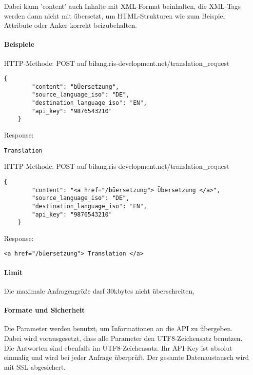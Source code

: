 Dabei kann 'content' auch Inhalte mit XML-Format beinhalten, die XML-Tags werden dann nicht mit übersetzt, 
um HTML-Strukturen wie zum Beispiel Attribute oder Anker korrekt beizubehalten.

\paragraph{Beispiele}

HTTP-Methode: POST auf bilang.ris-development.net/translation\_request
\begin{lstlisting}[extendedchars=\true,]
	{
		"content": "bÜersetzung", 
		"source_language_iso": "DE", 
		"destination_language_iso": "EN",
		"api_key": "9876543210"
	}
\end{lstlisting}


Response:
\begin{lstlisting}[extendedchars=\true,]
	Translation
\end{lstlisting}

 \vspace{2cm}

HTTP-Methode: POST auf bilang.ris-development.net/translation\_request
\begin{lstlisting}[extendedchars=\true,]
	{
		"content": "<a href="/büersetzung"> Übersetzung </a>",
		"source_language_iso": "DE",
		"destination_language_iso": "EN",
		"api_key": "9876543210"
	}
\end{lstlisting}

Response:
\begin{lstlisting}[extendedchars=\true,]
	<a href="/büersetzung"> Translation </a>
\end{lstlisting}

\paragraph{Limit}
Die maximale Anfragengröße darf 30kbytes nicht überschreiten, 

\paragraph{Formate und Sicherheit}
Die Parameter werden benutzt, um Informationen an die API zu übergeben. 
Dabei wird vorausgesetzt, dass alle Parameter den UTF8-Zeichensatz benutzen.
Die Antworten sind ebenfalls im UTF8-Zeichensatz.
Ihr API-Key ist absolut einmalig und wird bei jeder Anfrage überprüft.
Der gesamte Datenaustausch wird mit SSL abgesichert.